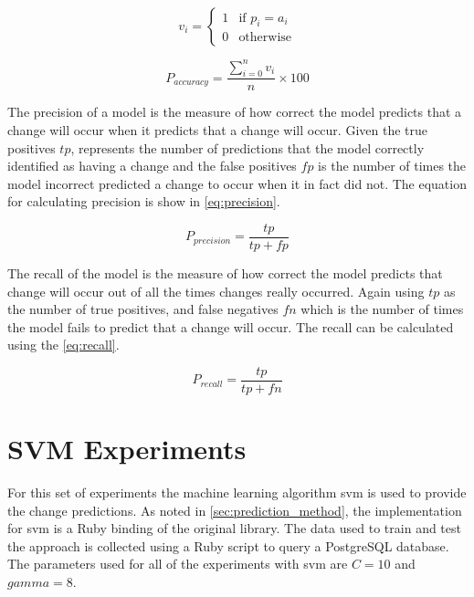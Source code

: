 \begin{equation} 
\label{eq:vector_accuracy}
v_i = \left\{\begin{matrix}
1 & \text{if } p_i = a_i\\ 
0 & \text{otherwise}
\end{matrix}\right.
\end{equation}

\begin{equation}
\label{eq:prediction_accuracy}
P_{accuracy} = \frac{\sum_{i=0}^{n}v_i}{n} \times 100
\end{equation}

The precision of a model is the measure of how correct the model predicts that a change will occur when it predicts that a change will occur. Given the true positives $tp$, represents the number of predictions that the model correctly identified as having a change and the false positives $fp$ is the number of times the model incorrect predicted a change to occur when it in fact did not. The equation for calculating precision is show in \autoref{eq:precision}.

\begin{equation} 
\label{eq:precision}
P_{precision} = \frac{tp}{tp+fp}
\end{equation}

The recall of the model is the measure of how correct the model predicts that change will occur out of all the times changes really occurred. Again using $tp$ as the number of true positives, and false negatives $fn$ which is the number of times the model fails to predict that a change will occur. The recall can be calculated using the \autoref{eq:recall}.

\begin{equation} 
\label{eq:recall}
P_{recall} = \frac{tp}{tp+fn}
\end{equation}

\section{SVM Experiments}
\label{sec:svm_experiments}

For this set of experiments the machine learning algorithm \gls{svm} is used to provide the change predictions. As noted in \autoref{sec:prediction_method}, the implementation for \gls{svm} is a Ruby binding of the original library. The data used to train and test the approach is collected using a Ruby script to query a PostgreSQL database. The parameters used for all of the experiments with \gls{svm} are $C = 10$ and $gamma = 8$.


